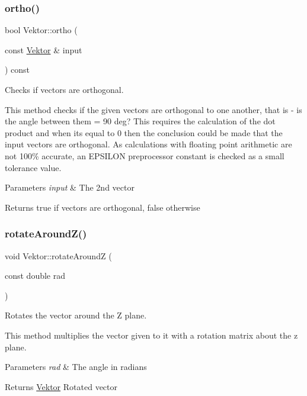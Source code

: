 \subsubsection{\texorpdfstring{ortho()}{ortho()}}
{\footnotesize\ttfamily bool Vektor\+::ortho (\begin{DoxyParamCaption}\item[{const \hyperlink{class_vektor}{Vektor} \&}]{input }\end{DoxyParamCaption}) const}



Checks if vectors are orthogonal. 

This method checks if the given vectors are orthogonal to one another, that is -\/ is the angle between them = 90 deg? This requires the calculation of the dot product and when it\textquotesingle{}s equal to 0 then the conclusion could be made that the input vectors are orthogonal. As calculations with floating point arithmetic are not 100\% accurate, an E\+P\+S\+I\+L\+ON preprocessor constant is checked as a small tolerance value.


\begin{DoxyParams}{Parameters}
{\em input} & The 2nd vector \\
\hline
\end{DoxyParams}
\begin{DoxyReturn}{Returns}
true if vectors are orthogonal, false otherwise 
\end{DoxyReturn}
\mbox{\label{class_vektor_a263858396c9751b803946e86947066e5}} 
\subsubsection{\texorpdfstring{rotate\+Around\+Z()}{rotateAroundZ()}}
{\footnotesize\ttfamily void Vektor\+::rotate\+AroundZ (\begin{DoxyParamCaption}\item[{const double}]{rad }\end{DoxyParamCaption})}



Rotates the vector around the Z plane. 

This method multiplies the vector given to it with a rotation matrix about the z plane.


\begin{DoxyParams}{Parameters}
{\em rad} & The angle in radians \\
\hline
\end{DoxyParams}
\begin{DoxyReturn}{Returns}
\hyperlink{class_vektor}{Vektor} Rotated vector 
\end{DoxyReturn}
\mbox{\label{class_vektor_ad517a8ae863c578a6d46c924ff3db1d5}} 
